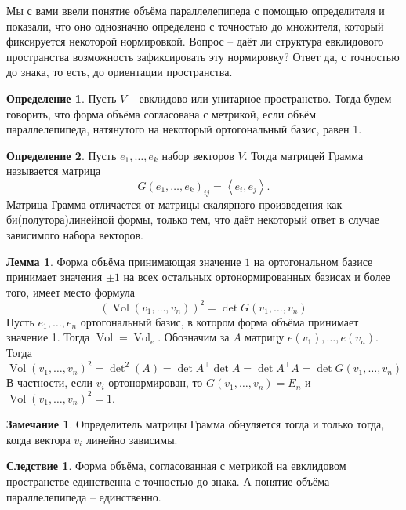 \documentclass[10pt,a4paper,oneside]{book} %
\theoremstyle{definition}
\newtheorem*{rem}{Замечание}
\newtheorem{zad}{Задача}
\newtheorem*{defn}{Определение}
\newtheorem{lem}{Лемма}
\newtheorem{cor}{Следствие}
\newcommand{\Vol}{\operatorname{Vol}}
\def\lan{\left\langle }
\def\ran{\right\rangle}
\def\dfn{\begin{defn}}
\def\edfn{\end{defn}}
\def\lm{\begin{lem}}
\def\elm{\end{lem}}
\def\zd{\begin{zad}}
\def\ezd{\end{zad}}
\def\crl{\begin{cor}}
\def\ecrl{\end{cor}}
\def\rm{\begin{rem}}
\def\erm{\end{rem}}
\begin{document}
Мы с вами ввели понятие объёма параллелепипеда с помощью определителя и показали, что оно однозначно определено с точностью до множителя, который фиксируется некоторой нормировкой. Вопрос -- даёт ли структура евклидового пространства возможность зафиксировать эту нормировку? Ответ да, с точностью до знака, то есть, до ориентации пространства.

\dfn Пусть $V$ -- евклидово или унитарное пространство. Тогда будем говорить, что форма объёма согласована с метрикой, если объём параллелепипеда, натянутого на некоторый ортогональный базис, равен 1.
\edfn

\dfn Пусть $e_1,\dots, e_k$ набор векторов $V$. Тогда матрицей Грамма называется матрица 
$$G(e_1,\dots,e_k)_{ij}= \lan e_i, e_j\ran.$$
Матрица Грамма отличается от матрицы скалярного произведения как би(полутора)линейной формы, только тем, что даёт некоторый ответ в случае зависимого набора векторов. 
\edfn

\lm
Форма объёма принимающая значение $1$ на ортогональном базисе принимает значения $\pm 1$ на всех остальных ортонормированных базисах и более того, имеет место формула
$$(\Vol(v_1,\dots,v_n))^2= \det G(v_1,\dots,v_n)$$
\proof Пусть $e_1,\dots,e_n$ ортогональный базис, в котором форма объёма принимает значение 1. Тогда $\Vol= \Vol_e$. Обозначим за $A$ матрицу $e(v_1),\dots,e(v_n)$. Тогда $$\Vol(v_1,\dots,v_n)^2= \det\nolimits^2 (A)= \det A^{\top} \det A= \det A^{\top}A= \det G(v_1,\dots,v_n)$$
В частности, если $v_i$ ортонормирован, то $G(v_1,\dots,v_n)=E_n$ и $\Vol(v_1,\dots,v_n)^2=1$.
\endproof
\elm

\rm Определитель матрицы Грамма обнуляется тогда и только тогда, когда вектора $v_i$ линейно зависимы.
\erm

\crl Форма объёма, согласованная с метрикой на евклидовом пространстве единственна с точностью до знака. А понятие объёма параллелепипеда -- единственно.
\ecrl


\begin{comment}

Так же можно дать явную формулу для расстояния через определители.
\lm Пусть подпространство $U$ имеет базис $e_1,\dots,e_k$. Тогда $\rho(x_0, U)^2 = \frac{\det G(e_1,\dots,e_k,x_0)}{\det G(e_1,\dots,e_k)}$ 
\elm 



\dfn $V$ --- евклидово пространство $U$ -- его подпространство, а $x_0$ вектор из $V$. Определим косинус угла $\angle x_0,U$ как 
$$\cos \angle x_0,U=\sup_{0\neq y\in U} \cos \angle x_0,y =\sup_{0\neq y\in U} \frac{|\lan x_0,y\ran| }{\|x_0\|\|y\|}.$$  
То есть мы ищем минимальный угол из отрезка $[0,\frac{\pi}{2}]$. Заметим, что в евклидовом случае отрицательные косинусы не имеют смысла, так как всегда можно домножить $y$ на $-1$.
\edfn

\lm Наименьший угол достигается между $x_0$ и его проекцией на $U$ и его косинус равен $\frac{\|pr_{U}x_0\|}{\|x_0\|}$.  
\elm


\zd Докажите аналогичное свойство в унитарном случае.
\ezd


\end{comment}
\end{document}
